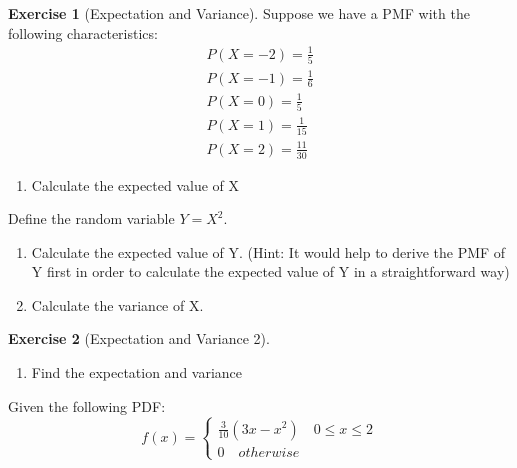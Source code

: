 \documentclass[
]{book}
\providecommand{\tightlist}{%
  \setlength{\itemsep}{0pt}\setlength{\parskip}{0pt}}
\theoremstyle{definition}
\theoremstyle{definition}
\theoremstyle{definition}
\newtheorem{exercise}{Exercise}[chapter]
\theoremstyle{remark}
\begin{document}
\begin{exercise}[Expectation and Variance]
\protect\hypertarget{exr:expvar}{}{\label{exr:expvar} {} }
Suppose we have a PMF with the following characteristics:
\begin{eqnarray*}
  P(X = -2) = \frac{1}{5}\\
  P(X = -1) = \frac{1}{6}\\
  P(X = 0) = \frac{1}{5}\\
  P(X = 1) = \frac{1}{15}\\
  P(X = 2) = \frac{11}{30}
\end{eqnarray*}

\begin{enumerate}
\def\labelenumi{\arabic{enumi}.}
\tightlist
\item
  Calculate the expected value of X
\end{enumerate}

Define the random variable \(Y = X^2\).

\begin{enumerate}
\def\labelenumi{\arabic{enumi}.}
\setcounter{enumi}{1}
\item
  Calculate the expected value of Y. (Hint: It would help to derive the PMF of Y first in order to calculate the expected value of Y in a straightforward way)
\item
  Calculate the variance of X.
\end{enumerate}
\end{exercise}

\begin{exercise}[Expectation and Variance 2]
\protect\hypertarget{exr:expvar2}{}{\label{exr:expvar2} {} }

\begin{enumerate}
\def\labelenumi{\arabic{enumi}.}
\tightlist
\item
  Find the expectation and variance
\end{enumerate}

Given the following PDF:
\[f(x) =  \begin{cases}
              \frac{3}{10}(3x - x^2) \quad 0 \leq x \leq 2\\
               0 \quad otherwise
            \end{cases}
               \]
\end{exercise}
\end{document}
